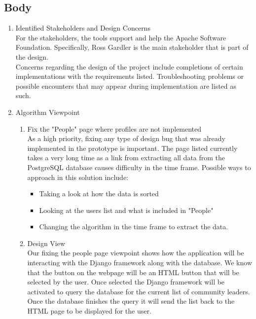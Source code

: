 \documentclass[draftclsnofoot,10pt,onecolumn]{IEEEtran} %
\begin{document}
\subsection{Body}
	\begin{enumerate}
		\item Identified Stakeholders and Design Concerns \\
		For the stakeholders, the tools support and help the Apache Software Foundation. Specifically, Ross Gardler is the
		main stakeholder that is part of the design.\\
		
		Concerns regarding the design of the project include completions of certain implementations with the requirements
		listed. Troubleshooting problems or possible encounters that may appear during implementation are listed as such.\\
		
		\item Algorithm Viewpoint \\
			\begin{enumerate}
				\item Fix the "People" page where profiles are not implemented \\
				As a high priority, fixing any type of design bug that was already implemented in the prototype is
				important. The page listed currently takes a very long time as a link from extracting all data from the
				PostgreSQL database causes difficulty in the time frame. Possible ways to approach in this solution
				include:
				\begin{itemize}
					\item Taking a look at how the data is sorted
					\item Looking at the users list and what is included in "People"
					\item Changing the algorithm in the time frame to extract the data.\\
				\end{itemize}
				
				\item Design View \\%
				Our fixing the people page viewpoint shows how the application will be interacting with the Django
				framework along with the database. We know that the button on the webpage will be an HTML button that
				will be selected by the user. Once selected the Django framework will be activated to query the database
				for the current list of community leaders. Once the database finishes the query it will send the list back to
				the HTML page to be displayed for the user.\\
				

\end{enumerate}
\end{enumerate}
\end{document}
